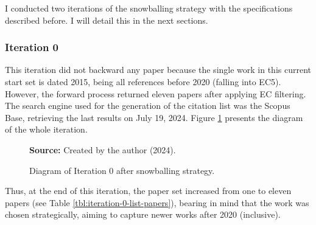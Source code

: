 I conducted two iterations of the snowballing strategy with the specifications described before. I will detail this in the next sections.

\subsubsection{Iteration 0}

This iteration did not backward any paper because the single work in this current start set \cite{lewis:2015} is dated 2015, being all references before 2020 (falling into \gls{EC}5). However, the forward process returned eleven papers after applying \gls{EC} filtering. The search engine used for the generation of the citation list was the Scopus Base, retrieving the last results on July 19, 2024. Figure \ref{fig:first-iteration} presents the diagram of the whole iteration.

\begin{figure}[htb]
\centering

\caption{\textmd{Diagram of Iteration 0 after snowballing strategy.}}
\label{fig:first-iteration}

\par\medskip\ABNTEXfontereduzida\selectfont\textbf{Source:} Created by the author (2024).
\end{figure}

Thus, at the end of this iteration, the paper set increased from one to eleven papers (see Table \ref{tbl:iteration-0-list-papers}), bearing in mind that the work \cite{lewis:2015} was chosen strategically, aiming to capture newer works after 2020 (inclusive).

